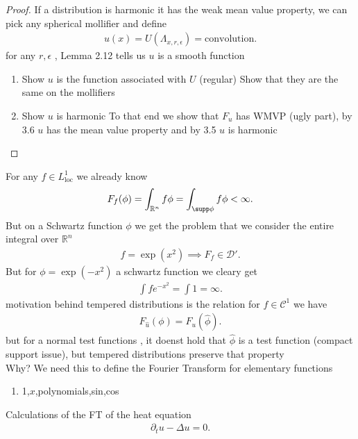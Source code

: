 \begin{proof}
If a distribution is harmonic it has the weak mean value property, we can pick any spherical mollifier and define 
\begin{align*}
  u(x) = U(\Lambda_{x,r,\epsilon})  = \text{convolution}
.\end{align*}
for any $r,\epsilon$ , Lemma 2.12 tells us $u$ is a smooth function 
\begin{enumerate}
  \item Show $u$ is the function associated with $U$ (regular)  
    Show that they are the same on the mollifiers
  \item Show $u$ is harmonic
    To that end we show that $F_u$ has WMVP (ugly part), by 3.6 $u$ has the mean value property and by 3.5 $u$ is harmonic
\end{enumerate}
\end{proof}
\begin{example}
  For any $f \in  L^{1}_{\text{loc}} $ we already know 
  \begin{align*}
    F_f(\phi ) = \int_{\mathbb{R}^{n} } f \phi   =  \int_{\supp \phi  }  f \phi  < \infty
  .\end{align*}
  But on a Schwartz function $\phi $ we get the problem that we consider the entire integral over $\mathbb{R}^{n} $
  \begin{align*}
    f=\exp(x^2) \implies F_f \in  \mathcal{D}'
  .\end{align*}
  But for $\phi  = \exp (-x^2)$ a schwartz function we cleary get 
  \begin{align*}
    \int  f e^{-x^2} =  \int 1 = \infty
  .\end{align*}
  motivation behind tempered distributions is the relation for $f \in  \mathcal{C}^{1} $ we have
  \begin{align*}
    F_{\hat{u} }(\phi ) = F_u(\hat{\phi } )
  .\end{align*}
  but for a normal test functions , it doenst hold that $\hat{\phi} $ is a test function (compact support issue), but 
  tempered distributions preserve that property \\ 
  Why? We need this to define the Fourier Transform for elementary functions
  \begin{enumerate}
    \item 1,$x$,polynomials,sin,cos
  \end{enumerate}
\end{example}
\begin{example}
 Calculations of the FT of the heat equation 
 \begin{align*}
  \partial_t u - \Delta  u = 0
 .\end{align*}
\end{example}
